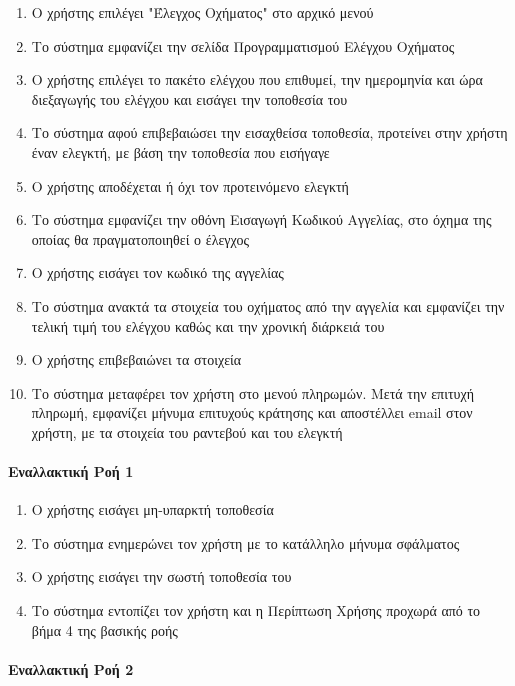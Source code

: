 \documentclass{../ol-softwaremanual}
\begin{document}
	\begin{enumerate}
		\item Ο χρήστης επιλέγει \en"\gr Έλεγχος Οχήματος\en" \gr στο αρχικό μενού
		\item Το σύστημα εμφανίζει την σελίδα Προγραμματισμού Ελέγχου Οχήματος
		\item Ο χρήστης επιλέγει το πακέτο ελέγχου που επιθυμεί, την ημερομηνία και ώρα διεξαγωγής του ελέγχου και εισάγει την τοποθεσία του
		\item Το σύστημα αφού επιβεβαιώσει την εισαχθείσα τοποθεσία, προτείνει στην χρήστη έναν ελεγκτή, με βάση την τοποθεσία που εισήγαγε
		\item Ο χρήστης αποδέχεται ή όχι τον προτεινόμενο ελεγκτή
		\item Το σύστημα εμφανίζει την οθόνη Εισαγωγή Κωδικού Αγγελίας, στο όχημα της οποίας θα πραγματοποιηθεί ο έλεγχος		
		\item Ο χρήστης εισάγει τον κωδικό της αγγελίας
		\item Το σύστημα ανακτά τα στοιχεία του οχήματος από την αγγελία και εμφανίζει την τελική τιμή του ελέγχου καθώς και την χρονική διάρκειά του
		\item Ο χρήστης επιβεβαιώνει τα στοιχεία
		\item Το σύστημα μεταφέρει τον χρήστη στο μενού πληρωμών. Μετά την επιτυχή πληρωμή, εμφανίζει μήνυμα επιτυχούς κράτησης και αποστέλλει \en email \gr στον χρήστη, με τα στοιχεία του ραντεβού και του ελεγκτή		
	\end{enumerate}
	
	\paragraph{Εναλλακτική Ροή 1}
	
	\begin{enumerate}
		\item Ο χρήστης εισάγει μη-υπαρκτή τοποθεσία
		\item Το σύστημα ενημερώνει τον χρήστη με το κατάλληλο μήνυμα σφάλματος 
		\item Ο χρήστης εισάγει την σωστή τοποθεσία του
		\item Το σύστημα εντοπίζει τον χρήστη και η Περίπτωση Χρήσης προχωρά από το βήμα 4 της βασικής ροής
	\end{enumerate}
	
	\paragraph{Εναλλακτική Ροή 2}
	
\end{document}
